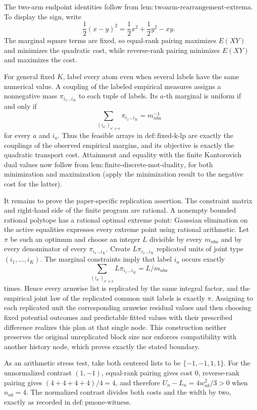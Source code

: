 The two-arm endpoint identities follow from \(\mathrm{lem:twoarm\text{-}rearrangement\text{-}extrema}\).  To display the sign, write
\[
 \frac12(x-y)^2=\frac12x^2+\frac12y^2-xy.
\]
The marginal square terms are fixed, so equal-rank pairing maximizes \(E(XY)\) and minimizes the quadratic cost, while reverse-rank pairing minimizes \(E(XY)\) and maximizes the cost.

For general fixed \(K\), label every atom even when several labels have the same numerical value.  A coupling of the labeled empirical measures assigns a nonnegative mass \(\pi_{i_1\ldots i_K}\) to each tuple of labels.  Its \(a\)-th marginal is uniform if and only if
\[
 \sum_{(i_{a'})_{a'\ne a}}\pi_{i_1\ldots i_K}=m_{nba}^{-1}
\]
for every \(a\) and \(i_a\).  Thus the feasible arrays in \(\mathrm{def:fixed\text{-}k\text{-}lp}\) are exactly the couplings of the observed empirical margins, and its objective is exactly the quadratic transport cost.  Attainment and equality with the finite Kantorovich dual values now follow from \(\mathrm{lem:finite\text{-}discrete\text{-}mot\text{-}duality}\), for both minimization and maximization (apply the minimization result to the negative cost for the latter).

It remains to prove the paper-specific replication assertion.  The constraint matrix and right-hand side of the finite program are rational.  A nonempty bounded rational polytope has a rational optimal extreme point: Gaussian elimination on the active equalities expresses every extreme point using rational arithmetic.  Let \(\pi\) be such an optimum and choose an integer \(L\) divisible by every \(m_{nba}\) and by every denominator of every \(\pi_{i_1\ldots i_K}\).  Create \(L\pi_{i_1\ldots i_K}\) replicated units of joint type \((i_1,\ldots,i_K)\).  The marginal constraints imply that label \(i_a\) occurs exactly
\[
 \sum_{(i_{a'})_{a'\ne a}}L\pi_{i_1\ldots i_K}=L/m_{nba}
\]
times.  Hence every armwise list is replicated by the same integral factor, and the empirical joint law of the replicated common unit labels is exactly \(\pi\).  Assigning to each replicated unit the corresponding armwise residual values and then choosing fixed potential outcomes and predictable fitted values with their prescribed difference realizes this plan at that single node.  This construction neither preserves the original unreplicated block size nor enforces compatibility with another history node, which proves exactly the stated boundary.

As an arithmetic stress test, take both centered lists to be \(\{-1,-1,1,1\}\).  For the unnormalized contrast \((1,-1)\), equal-rank pairing gives cost \(0\), reverse-rank pairing gives \((4+4+4+4)/4=4\), and therefore \(U_n-L_n=4w_{nb}^2/3>0\) when \(n_{nb}=4\).  The normalized contrast divides both costs and the width by two, exactly as recorded in \(\mathrm{def:pmone\text{-}witness}\).